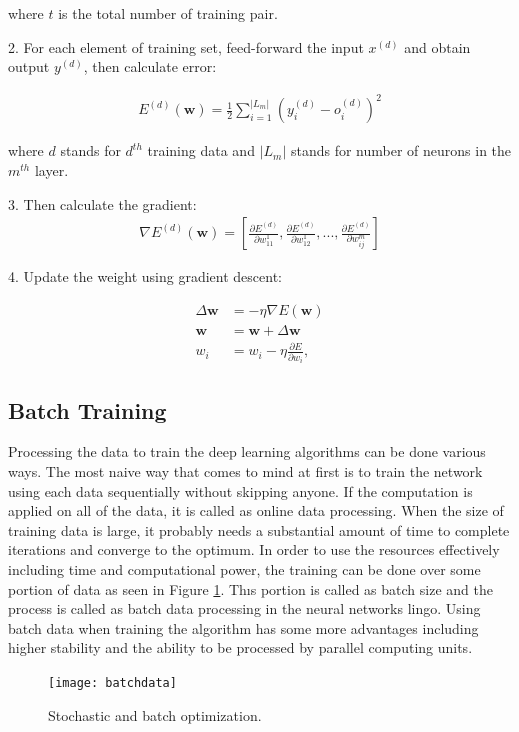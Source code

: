 \documentclass{ituphdreport}
\begin{document}
where $t$ is the total number of training pair.

2. For each element of training set, feed-forward the input $x^{(d)}$ and obtain output $y^{(d)}$, then calculate error:

\begin{equation}
\begin{aligned}
E^{(d)}(\boldsymbol{w}) = \frac{1}{2} \sum_{i=1}^{|L_m|} (y^{(d)}_i - o^{(d)}_i)^2
\end{aligned}
\end{equation}

where $d$ stands for $d^{th}$ training data and ${|L_m|} $ stands for number of neurons in the $m^{th}$ layer.

3. Then calculate the gradient:
\begin{equation}
\begin{aligned}
\nabla E^{(d)}(\boldsymbol{w})=\left [
\frac{\partial E^{(d)}}{\partial w^1_{11}},
\frac{\partial E^{(d)}}{\partial w^1_{12}},
...,
\frac{\partial E^{(d)}}{\partial w^m_{ij}}
\right]
\end{aligned}
\end{equation}

4. Update the weight using gradient descent:

\begin{equation}
\begin{aligned}
\Delta \boldsymbol{w} &= -\eta \nabla E(\boldsymbol{w}) \\
\boldsymbol{w} &= \boldsymbol{w} + \Delta \boldsymbol{w}\\
w_i &= w_i - \eta \frac{\partial E}{\partial w_i},
\end{aligned}
\end{equation}

\subsection{Batch Training}
Processing the data to train the deep learning algorithms can be done various ways. The most naive way that comes to mind at first is to train the network using each data sequentially without skipping anyone. If the computation is applied on all of the data, it is called as online data processing. When the size of training data is large,  it probably needs a substantial amount of time to complete iterations and converge to the optimum. In order to use the resources effectively including time and computational power, the training can be done over some portion of data as seen in Figure \ref{fig:batchdata}. Thıs portion is called as batch size and the process is called as batch data processing in the neural networks lingo. Using batch data when training the algorithm has some more advantages including higher stability and the ability to be processed by parallel computing units. 
\begin{figure}[h]
	\begin{center}
		\texttt{[image: batchdata]}
	\end{center}
	\caption{Stochastic and batch optimization.
		\label{fig:batchdata}}
\end{figure}
\end{document}

